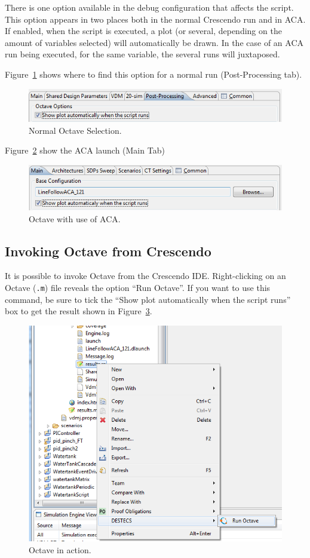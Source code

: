 \documentclass{crescendorepchap}
\begin{document}
There is one option available in the debug configuration that affects
the script. This option appears in two places both in the normal Crescendo
run and in ACA. If enabled, when the script is executed, a plot (or
several, depending on the amount of variables selected) will
automatically be drawn. In the case of an ACA run being executed, for
the same variable, the several runs will juxtaposed.

Figure~\ref{fig:octaveplotnormal} shows where to find this option for a normal run
(Post-Processing tab).

\begin{figure}[htbp]
\centering
\includegraphics[width=.6\textwidth]{images/TickOctaveplotNormal.png}
\caption{Normal Octave Selection.}
\label{fig:octaveplotnormal}
\end{figure}

Figure~\ref{fig:octaveplotaca} show the ACA launch (Main Tab)

\begin{figure}[htbp]
\centering
\includegraphics[width=.6\textwidth]{images/TickOctavePlotACA.png}
\caption{Octave with use of ACA.}
\label{fig:octaveplotaca}
\end{figure}

\subsection{Invoking Octave from Crescendo}

It is possible to invoke Octave from the Crescendo IDE. Right-clicking on
an Octave (\texttt{.m}) file reveals the option ``Run Octave''. If you want to
use this command, be sure to tick the ``Show plot automatically when the
script runs'' box to get the result shown in Figure~\ref{fig:octPlot}.

\begin{figure}[htbp]
\centering
\includegraphics[width=.6\textwidth]{images/OctaveAction.png}
\caption{Octave in action.\label{fig:octPlot}}
\end{figure}
\end{document}
